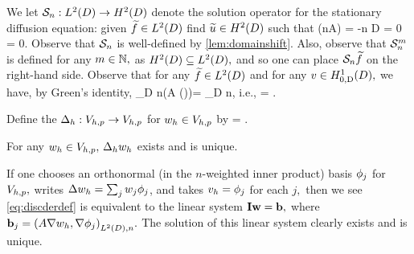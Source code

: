 We let $\DeltaAI:\LtD\rightarrow\HtD$ denote the solution operator for the stationary diffusion equation: given $\ftilde \in \LtD$ find $\utilde \in \HtD$ such that
\beq\label{eq:sdeq}
\grad \cdot \mleft(nA\grad \utilde\mright) = -n\ftilde {} D
\eeq
\beq\label{eq:sddbc}
\trD \utilde = 0
\eeq
\beq\label{eq:sdnbc}
\dn \utilde = 0.
\eeq
Observe that $\mathcal S_{n}$ is well-defined by \cref{lem:domainshift}. Also, observe that $\mathcal S_{n}^{m}$ is defined for any $m \in \mathbb N,$ as $\HtD \subseteq \LtD,$ and so one can place $\mathcal S_{n} \widetilde{f}$ on the right-hand side. 
Observe that for any $\ftilde \in \LtD$ and for any $v \in \HozDD,$ we have, by Green's identity,
\beqs\label{eq:deltaagreen}
\int_D n\mleft(A \grad \mleft(\DeltaAI\ftilde\mright)\mright)\cdot \grad \vb = \int_D n\ftilde \vb,
\eeqs
i.e.,
\beqs
{} = .
\eeqs
{}

Define the  $\Delta_{h}:V_{h,p}\rightarrow V_{h,p}$ for $w_{h} \in V_{h,p}$ by
\beq\label{eq:discderdef}
\IPLtDn{\Deltah \wh}{\vh} =  \tforall \vh \in \Vhp.
\eeq
\ede

\label{lem:ddwd}
For any $w_{h} \in V_{h,p},$ $\Delta_{h} w_{h}$ exists and is unique.
\ele

If one chooses an orthonormal (in the $n$-weighted inner product) basis  $\phi_{j}$ for $V_{h,p},$ writes $\Delta w_{h} = \sum_j w_{j} \phi_{j}$, and takes $v_{h} = \phi_{j}$ for each $j,$ then we see \cref{eq:discderdef} is equivalent to the linear system $\mathbf{I} \mathbf{w} = \mathbf{b},$ where $\bb_{j} = \IPLtDn{A \grad \wh}{\grad \phij}.$ The solution of this linear system clearly exists and is unique.
\epf

